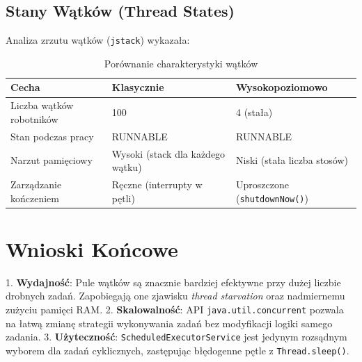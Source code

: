 \documentclass[11pt,a4paper]{article}
\begin{document}
\subsection{Stany Wątków (Thread States)}
Analiza zrzutu wątków (\texttt{jstack}) wykazała:
\begin{table}[h]
\centering
\begin{tabular}{@{}lll@{}}
\toprule
\textbf{Cecha} & \textbf{Klasycznie} & \textbf{Wysokopoziomowo} \\ \midrule
Liczba wątków robotników & 100 & 4 (stała) \\
Stan podczas pracy & RUNNABLE & RUNNABLE \\
Narzut pamięciowy & Wysoki (stack dla każdego wątku) & Niski (stała liczba stosów) \\
Zarządzanie kończeniem & Ręczne (interrupty w pętli) & Uproszczone (\texttt{shutdownNow()}) \\ \bottomrule
\end{tabular}
\caption{Porównanie charakterystyki wątków}
\end{table}

\section{Wnioski Końcowe}
1. \textbf{Wydajność}: Pule wątków są znacznie bardziej efektywne przy dużej liczbie drobnych zadań. Zapobiegają one zjawisku \textit{thread starvation} oraz nadmiernemu zużyciu pamięci RAM.
2. \textbf{Skalowalność}: API \texttt{java.util.concurrent} pozwala na łatwą zmianę strategii wykonywania zadań bez modyfikacji logiki samego zadania.
3. \textbf{Użyteczność}: \texttt{ScheduledExecutorService} jest jedynym rozsądnym wyborem dla zadań cyklicznych, zastępując błędogenne pętle z \texttt{Thread.sleep()}.
\end{document}
